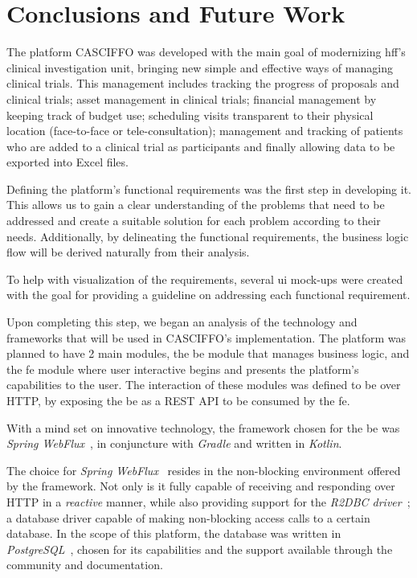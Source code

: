 % 
%
\chapter{Conclusions and Future Work}\label{ch:conclusion}

The platform CASCIFFO was developed with the main goal of modernizing \acrshort{hff}'s clinical investigation unit, bringing new simple and effective ways of managing clinical trials. 
This management includes tracking the progress of proposals and clinical trials; asset management in clinical trials; financial management by keeping track of budget use; scheduling visits transparent to their physical location (face-to-face or tele-consultation); management and tracking of patients who are added to a clinical trial as participants and finally allowing data to be exported into Excel files.

Defining the platform's functional requirements was the first step in developing it. This allows us to gain a clear understanding of the problems that need to be addressed and create a suitable solution for each problem according to their needs. Additionally, by delineating the functional requirements, the business logic flow will be derived naturally from their analysis. 

To help with visualization of the requirements, several \acrfull{ui} mock-ups were created with the goal for providing a guideline on addressing each functional requirement.

Upon completing this step, we began an analysis of the technology and frameworks that will be used in CASCIFFO's implementation. 
The platform was planned to have 2 main modules, the \acrfull{be} module that manages business logic, and the \acrfull{fe} module where user interactive begins and presents the platform's capabilities to the user. The interaction of these modules was defined to be over HTTP, by exposing the \acrshort{be} as a REST API to be consumed by the \acrshort{fe}.

With a mind set on innovative technology, the framework chosen for the \acrshort{be} was \textit{Spring WebFlux}~\cite{spring-webflux}, in conjuncture with \textit{Gradle} and written in \textit{Kotlin}.

The choice for \textit{Spring WebFlux}~\cite{spring-webflux} resides in the non-blocking environment offered by the framework. Not only is it fully capable of receiving and responding over HTTP in a \emph{reactive} manner, while also providing support for the \textit{R2DBC driver}~\cite{r2dbc}; a database driver capable of making non-blocking access calls to a certain database. 
In the scope of this platform, the database was written in \textit{PostgreSQL}~\cite{postgresql}, chosen for its capabilities and the support available through the community and documentation.

